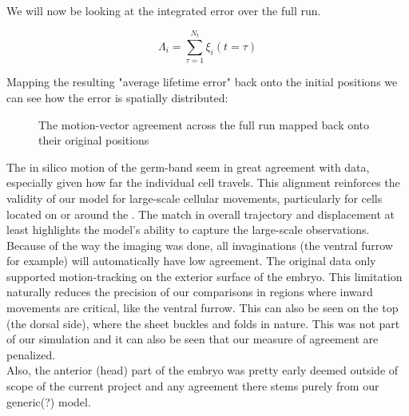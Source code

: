 We will now be looking at the integrated error over the full run.

\begin{equation}
     \Lambda_i = \sum_{\tau = 1}^{N_t}\xi_i(t=\tau)
\end{equation}

Mapping the resulting "average lifetime error" back onto the initial positions we can see how the error is spatially distributed:
\begin{figure}[H]
    \centering
    \caption{The motion-vector agreement across the full run mapped back onto their original positions }
    \label{fig:}
\end{figure}

The in silico motion of the germ-band seem in great agreement with data, especially given how far the individual cell travels. This alignment reinforces the validity of our model for large-scale cellular movements, particularly for cells located on or around the . The match in overall trajectory and displacement at least highlights the model's ability to capture the large-scale observations.\\
Because of the way the imaging was done, all invaginations (the ventral furrow for example) will automatically have low agreement. The original data only supported motion-tracking on the exterior surface of the embryo.  This limitation naturally reduces the precision of our comparisons in regions where inward movements are critical, like the ventral furrow. This can also be seen on the top (the dorsal side), where the sheet buckles and folds in nature. This was not part of our simulation and it can also be seen that our measure of agreement are penalized.\\
Also, the anterior (head) part of the embryo was pretty early deemed outside of scope of the current project and any agreement there stems purely from our generic(?) model.\\

